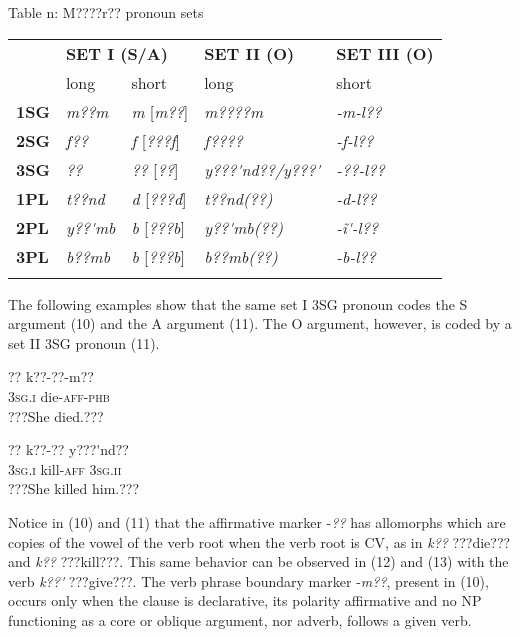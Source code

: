 \documentclass[output=paper]{langsci/langscibook}
\begin{document}
\begin{table}\caption{
\label{bkm:Ref424142670}Table n: M????r?? pronoun sets
}\end{table}

\begin{tabularx}{\textwidth}{XXXXX}
\lsptoprule
\hhline{~----} & \multicolumn{2}{l}{ \textbf{SET I (S/A)}} & \textbf{SET II (O)} & \textbf{SET III (O)}\\
& long & short & long & short\\
\textbf{1SG} & \textit{m??m} & \textit{m   }[\textit{m??}] & \textit{m????m} & \textit{{}-m-l??}\\
\textbf{2SG} & \textit{f??} & \textit{f     }[\textit{???f}] & \textit{f????} & \textit{{}-f-l??}\\
\textbf{3SG} & \textit{??} & \textit{??    }[\textit{??}] & \textit{y???\'{ }nd??/y???\'{ }} & \textit{{}-??-l??}\\
\textbf{1PL} & \textit{t??nd} & \textit{d}    [\textit{???d}] & \textit{t??nd(??)} & \textit{{}-d-l??}\\
\textbf{2PL} & \textit{y??\'{ }mb} & \textit{b    }[\textit{???b}] & \textit{y??\'{ }mb(??)} & \textit{{}-\~{i}\'{ }-l??}\\
\textbf{3PL} & \textit{b??mb} & \textit{b    }[\textit{???b}] & \textit{b??mb(??)} & \textit{{}-b-l??}\\
\lspbottomrule
\end{tabularx}
The following examples show that the same set I 3SG pronoun codes the S argument (10) and the A argument (11). The O argument, however, is coded by a set II 3SG pronoun (11).

\ea \gll 
\label{bkm:Ref424141576}??    k??-??{}-m??          
\\
%
\textsc{3sg.i    }die-\textsc{aff-phb}
\\\glt
???She died.???
\z

\ea \gll 
\label{bkm:Ref424141584}??    k??-??    y???\'{ }nd??
\\
%
\textsc{3sg.i}    kill-\textsc{aff  3sg.ii}
\\\glt
???She killed him.???
\z

Notice in (10) and (11) that the affirmative marker -\textit{??} has allomorphs which are copies of the vowel of the verb root when the verb root is CV, as in \textit{k??} ???die??? and \textit{k??} ???kill???. This same behavior can be observed in (12) and (13) with the verb \textit{k??\'{ }} ???give???. The verb phrase boundary marker -\textit{m??}, present in (10), occurs only when the clause is declarative, its polarity affirmative and no NP functioning as a core or oblique argument, nor adverb, follows a given verb.  
\end{document}

